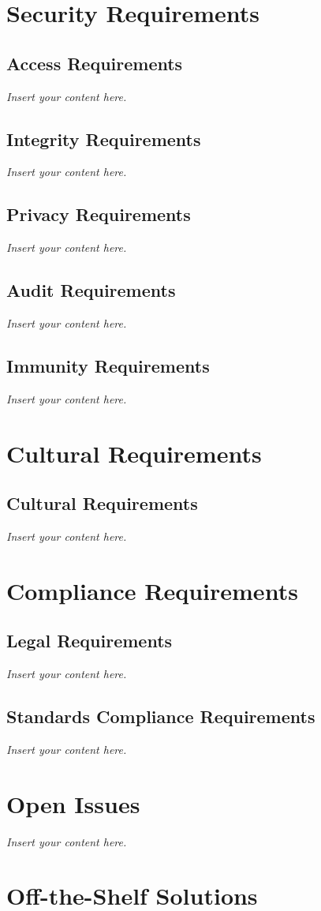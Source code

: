 \documentclass[12pt]{article}
\newcommand{\lips}{\textit{Insert your content here.}}
\begin{document}
\section{Security Requirements}
\subsection{Access Requirements}
\lips
\subsection{Integrity Requirements}
\lips
\subsection{Privacy Requirements}
\lips
\subsection{Audit Requirements}
\lips
\subsection{Immunity Requirements}
\lips

\section{Cultural Requirements}
\subsection{Cultural Requirements}
\lips

\section{Compliance Requirements}
\subsection{Legal Requirements}
\lips
\subsection{Standards Compliance Requirements}
\lips

\section{Open Issues}
\lips

\section{Off-the-Shelf Solutions}
\end{document}
